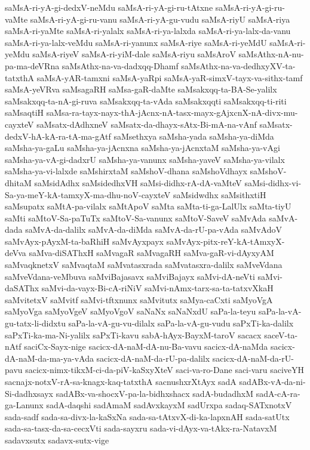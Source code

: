 {saMsA-ri-yA-gi-dedxV-neMdu
saMsA-ri-yA-gi-ru-tAtxne
saMsA-ri-yA-gi-ru-vaMte
saMsA-ri-yA-gi-ru-vanu
saMsA-ri-yA-gu-vudu
saMsA-riyU
saMsA-riya
saMsA-ri-yaMte
saMsA-ri-yalalx
saMsA-ri-ya-lalxda
saMsA-ri-ya-lalx-da-vanu
saMsA-ri-ya-lalx-veMdu
saMsA-ri-yanunx
saMsA-riye
saMsA-ri-yeMdU
saMsA-ri-yeMdu
saMsA-riyeV
saMsA-ri-yiM-dale
saMsA-riyu
saMsAroV
saMsAthx-nA-nu-pa-ma-deVRna
saMsAthx-na-va-dadxqq-Dhamf
saMsAthx-na-va-dedhxyXV-ta-tatxthA
saMsA-yAR-tamxni
saMsA-yaRpi
saMsA-yaR-simxV-tayx-va-sithx-tamf
saMsA-yeVRva
saMsagaRH
saMsa-gaR-daMte
saMsakxqq-ta-BA-Se-yalilx
saMsakxqq-ta-nA-gi-ruva
saMsakxqq-ta-vAda
saMsakxqqti
saMsakxqq-ti-riti
saMsaqtiH
saMsa-ra-tayx-nayx-thA-jAcnx-nA-tasx-mayx-gAjxcnX-nA-divx-mu-cayxteV
saMsatx-dAdhxneV
saMsatx-da-dhayx-sAtx-Bi-mA-na-vAnf
saMsatx-dedxV-hA-kA-ra-tA-ma-gAtf
saMsethxya
saMsha-yada
saMsha-ya-diMda
saMsha-ya-gaLu
saMsha-ya-jAcnxna
saMsha-ya-jAcnxtaM
saMsha-ya-vAgi
saMsha-ya-vA-gi-dadxrU
saMsha-ya-vanunx
saMsha-yaveV
saMsha-ya-vilalx
saMsha-ya-vi-lalxde
saMshirxtaM
saMshoV-dhana
saMshoVdhayx
saMshoV-dhitaM
saMsidAdhx
saMsidedhxVH
saMsi-didhx-rA-dA-vaMteV
saMsi-didhx-vi-Sa-ya-meY-kA-tamxyX-ma-dhu-noV-cayxteV
saMsidwdhx
saMsithxtiH
saMsupatx
saMtA-pa-vilalx
saMtApoV
saMta
saMta-ti-ga-LalUlx
saMta-tiyU
saMti
saMtoV-Sa-paTuTx
saMtoV-Sa-vanunx
saMtoV-SaveV
saMvAda
saMvA-dada
saMvA-da-dalilx
saMvA-da-diMda
saMvA-da-rU-pa-vAda
saMvAdoV
saMvAyx-pAyxM-ta-baRhiH
saMvAyxpayx
saMvAyx-pitx-reY-kA-tAmxyX-deVva
saMva-diSAThxH
saMvagaR
saMvagaRH
saMva-gaR-vi-dAyxyAM
saMvaqknetxV
saMvaqtaM
saMvatasxrada
saMvatasxra-dalilx
saMveVdana
saMveVdana-veMbuva
saMviBajasavx
saMviBajayx
saMvi-dA-neVti
saMvi-daSAThx
saMvi-da-vayx-Bi-cA-riNiV
saMvi-nAmx-tarx-sa-ta-tatxvXkaH
saMvitetxV
saMvitf
saMvi-tftxnunx
saMvitutx
saMya-caCxti
saMyoVgA
saMyoVga
saMyoVgeV
saMyoVgoV
saNaNx
saNaNxdU
saPa-la-teyu
saPa-la-vA-gu-tatx-li-didxtu
saPa-la-vA-gu-vu-dilalx
saPa-la-vA-gu-vudu
saPxTi-ka-dalilx
saPxTi-ka-ma-Ni-yalilx
saPxTi-kavu
sabA-hAyx-BayxM-taroV
sacacx
saceV-ta-nAtf
saciCx-Sayx-nige
sacicx-dA-naM-dA-nu-Ba-vavu
sacicx-dA-naMda
sacicx-dA-naM-da-ma-ya-vAda
sacicx-dA-naM-da-rU-pa-dalilx
sacicx-dA-naM-da-rU-pavu
sacicx-nimx-tikxM-ci-da-piV-kaSxyXteV
saci-va-ro-Dane
saci-varu
saciveYH
sacnajx-notxV-rA-sa-knagx-kaq-tatxthA
sacnushxrXtAyx
sadA
sadABx-vA-da-ni-Si-dadhxsayx
sadABx-va-shocxV-pa-la-bidhxshacx
sadA-budadhxM
sadA-cA-ra-ga-Lanunx
sadA-daqshi
sadAmaM
sadAvxkayxM
sadUrxpa
sadaq-SATxnotxV
sada-sadf
sada-sa-divx-la-kaSxNa
sada-sa-tAtxvX-di-ka-lapxnAH
sada-satUtx
sada-sa-tasx-da-sa-cecxVti
sada-sayxru
sada-vi-dAyx-va-tAkx-ra-NatavxM
sadavxsutx
sadavx-sutx-vige
}
